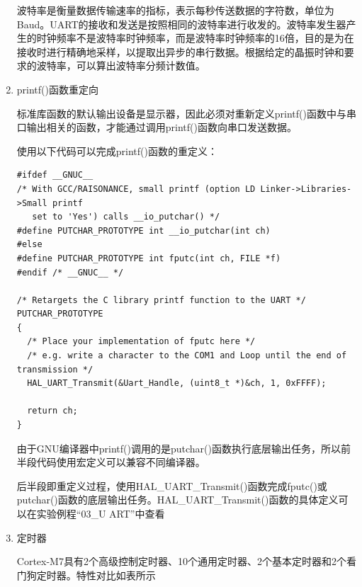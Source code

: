 ﻿\documentclass[UTF8,12pt]{article}
\begin{document}
\begin{enumerate}
  波特率是衡量数据传输速率的指标，表示每秒传送数据的字符数，单位为Baud。UART的接收和发送是按照相同的波特率进行收发的。波特率发生器产生的时钟频率不是波特率时钟频率，而是波特率时钟频率的16倍，目的是为在接收时进行精确地采样，以提取出异步的串行数据。根据给定的晶振时钟和要求的波特率，可以算出波特率分频计数值。

  \item printf()函数重定向
  
  标准库函数的默认输出设备是显示器，因此必须对重新定义printf()函数中与串口输出相关的函数，才能通过调用printf()函数向串口发送数据。

  使用以下代码可以完成printf()函数的重定义：
  
  \begin{lstlisting}[frame=shadowbox]
    #ifdef __GNUC__
/* With GCC/RAISONANCE, small printf (option LD Linker->Libraries->Small printf
   set to 'Yes') calls __io_putchar() */
#define PUTCHAR_PROTOTYPE int __io_putchar(int ch)
#else
#define PUTCHAR_PROTOTYPE int fputc(int ch, FILE *f)
#endif /* __GNUC__ */

/* Retargets the C library printf function to the UART */
PUTCHAR_PROTOTYPE
{
  /* Place your implementation of fputc here */
  /* e.g. write a character to the COM1 and Loop until the end of transmission */
  HAL_UART_Transmit(&Uart_Handle, (uint8_t *)&ch, 1, 0xFFFF);

  return ch;
}

  \end{lstlisting}

  由于GNU编译器中printf()调用的是putchar()函数执行底层输出任务，所以前半段代码使用宏定义可以兼容不同编译器。

  后半段即重定义过程，使用HAL\_UART\_Transmit()函数完成fputc()或putchar()函数的底层输出任务。HAL\_UART\_Transmit()函数的具体定义可以在实验例程“03\_U
  ART”中查看

  \item 定时器
  
  Cortex-M7具有2个高级控制定时器、10个通用定时器、2个基本定时器和2个看门狗定时器。特性对比如表所示


\end{enumerate}
\end{document}
